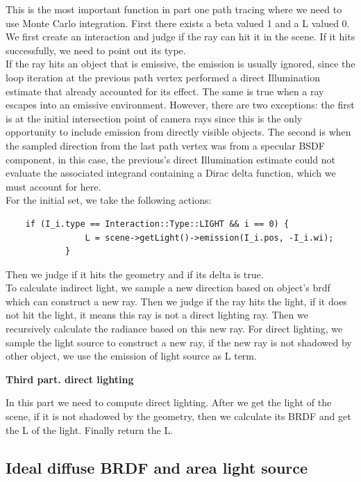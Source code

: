 \documentclass[acmtog]{acmart}
\begin{document}
This is the most important function in part one path tracing where we need to use Monte Carlo integration. First there exists a beta valued 1 and a L valued 0. We first create an interaction and judge if the ray can hit it in the scene. If it hits successfully, we need to point out its type. \\
If the ray hits an object that is emissive, the emission is usually ignored, since the loop iteration at the previous path vertex performed a direct Illumination estimate that already accounted for its effect. The same is true when a ray escapes into an emissive environment. However, there are two exceptions: the first is at the initial intersection point of camera rays since this is the only opportunity to include emission from directly visible objects. The second is when the sampled direction 
from the last path vertex was from a specular BSDF component, in this case, the previous's direct Illumination estimate could not 
evaluate the associated integrand containing a Dirac delta function, which we must account for here. \\
For the initial set, we take the following actions: \\
\begin{lstlisting}
	if (I_i.type == Interaction::Type::LIGHT && i == 0) {
                L = scene->getLight()->emission(I_i.pos, -I_i.wi);
            }
\end{lstlisting}

Then we judge if it hits the geometry and if its delta is true.\\
To calculate indirect light, we sample a new direction based on object's brdf which can construct a new ray. Then we judge if the ray hits the light, if it does not hit the light, it means this ray is not a direct lighting ray. Then we recursively calculate the radiance based on this new ray. For direct lighting, we sample the light source to construct a new ray, if the new ray is not shadowed by other object, we use the emission of light source as L term.

\textbf{Third part. direct lighting}

In this part we need to compute direct lighting. After we get the light of the scene, if it is not shadowed by the geometry, then we calculate its BRDF and get the L of the light. Finally return the L.

\subsection{Ideal diffuse BRDF and area light source}
\end{document}

